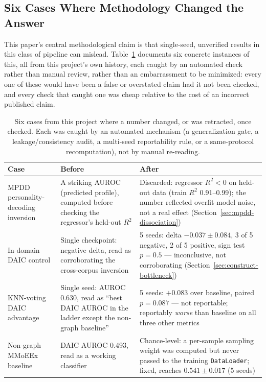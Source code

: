 \documentclass[twocolumn]{article}
\begin{document}
\subsection{Six Cases Where Methodology Changed the Answer}
\label{sec:repro-catalogue}

This paper's central methodological claim is that single-seed, unverified results in this class of pipeline can mislead. Table~\ref{tab:reversal_catalogue_journal} documents six concrete instances of this, all from this project's own history, each caught by an automated check rather than manual review, rather than an embarrassment to be minimized: every one of these would have been a false or overstated claim had it not been checked, and every check that caught one was cheap relative to the cost of an incorrect published claim.

\begin{table}[t]
\centering
\caption{Six cases from this project where a number changed, or was retracted, once checked. Each was caught by an automated mechanism (a generalization gate, a leakage/consistency audit, a multi-seed reportability rule, or a same-protocol recomputation), not by manual re-reading.}
\label{tab:reversal_catalogue_journal}
\small
\begin{tabular}{p{}p{}p{}}
\toprule
Case & Before & After \\
\midrule
MPDD personality-decoding inversion & A striking AUROC (predicted profile), computed before checking the regressor's held-out $R^2$ & Discarded: regressor $R^2 < 0$ on held-out data (train $R^2$ 0.91--0.99); the number reflected overfit-model noise, not a real effect (Section~\ref{sec:mpdd-dissociation}) \\
In-domain DAIC control & Single checkpoint: negative delta, read as corroborating the cross-corpus inversion & 5 seeds: delta $-0.037 \pm 0.084$, 3 of 5 negative, 2 of 5 positive, sign test $p{=}0.5$ — inconclusive, not corroborating (Section~\ref{sec:construct-bottleneck}) \\
KNN-voting DAIC advantage & Single seed: AUROC 0.630, read as ``best DAIC AUROC in the ladder except the non-graph baseline'' & 5 seeds: $+0.083$ over baseline, paired $p{=}0.087$ — not reportable; reportably \emph{worse} than baseline on all three other metrics \\
Non-graph MMoEEx baseline & DAIC AUROC 0.493, read as a working classifier & Chance-level: a per-sample sampling weight was computed but never passed to the training \texttt{DataLoader}; fixed, reaches $0.541\pm0.017$ (5 seeds) \\

\end{tabular}
\end{table}
\end{document}
